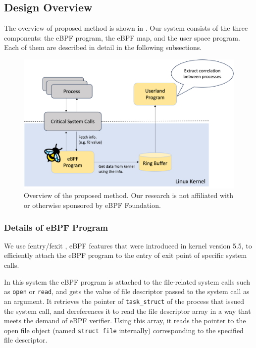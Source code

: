 \subsection{Design Overview}
The overview of proposed method is shown in .
Our system consists of the three components: the eBPF program, the eBPF map, and the user space program.
Each of them are described in detail in the following subsections.
\begin{figure}[t]
  \centering
  \includegraphics[width=1.5\columnwidth]{./img/proposal_overview.png}
  \caption{Overview of the proposed method. Our research is not
    affiliated with or otherwise sponsored by eBPF Foundation\cite{BrandGui21:online}.}
  \label{img:proposal-overview}
\end{figure}

\subsubsection{Details of eBPF Program}
We use fentry/fexit \cite{learning-ebpf}, eBPF features that were introduced in kernel version 5.5,
to efficiently attach the eBPF program to the entry of exit point of specific system calls.

In this system the eBPF program is attached to the file-related system calls such as \texttt{open} or \texttt{read},
and gets the value of file descriptor passed to the system call as an argument.
It retrieves the pointer of \texttt{task\_struct} \cite{schedhin43:online} of the process that issued the system call,
and dereferences it to read the file descriptor array in a way that meets the demand of eBPF verifier.
Using this array,
it reads the pointer to the open file object (named \texttt{struct file} \cite{fshinclu57:online} internally)
corresponding to the specified file descriptor.


